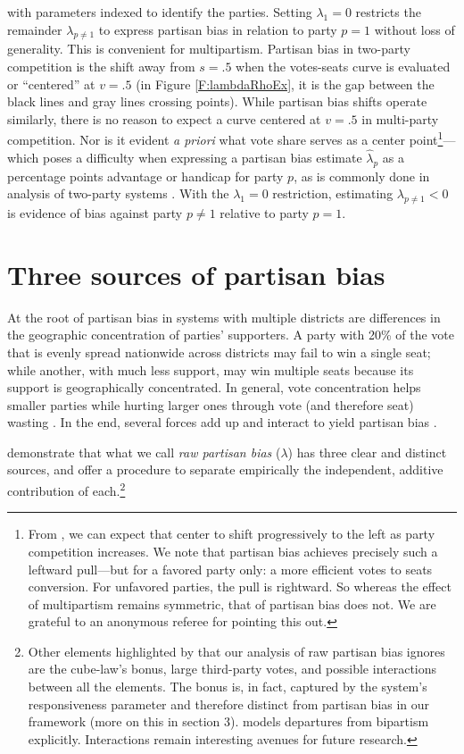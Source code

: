 \documentclass[letter,12pt]{article}
\begin{document}
\noindent with parameters indexed to identify the parties. Setting $\lambda_1 = 0$ restricts the remainder $\lambda_{p \neq 1}$ to express partisan bias in relation to party $p=1$ without loss of generality. This is convenient for multipartism. Partisan bias in two-party competition is the shift away from $s=.5$ when the votes-seats curve is evaluated or ``centered'' at $v=.5$ (in Figure \ref{F:lambdaRhoEx}, it is the gap between the black lines and gray lines crossing points). While partisan bias shifts operate similarly, there is no reason to expect a curve centered at $v=.5$ in multi-party competition. Nor is it evident \emph{a priori} what vote share serves as a center point\footnote{From \citet[][:Fig.~1]{calvo.micozzi.govReform.2005}, we can expect that center to shift progressively to the left as party competition increases. We note that partisan bias achieves precisely such a leftward pull---but for a favored party only: a more efficient votes to seats conversion. For unfavored parties, the pull is rightward. So whereas the effect of multipartism remains symmetric, that of partisan bias does not. We are grateful to an anonymous referee for pointing this out.}---which poses a difficulty when expressing a partisan bias estimate $\hat{\lambda}_p$ as a percentage points advantage or handicap for party $p$, as is commonly done in analysis of two-party systems \citep[e.g.,][]{cox.katz.2002}. With the $\lambda_1 = 0$ restriction, estimating $\lambda_{p \neq 1}<0$ is evidence of bias against party $p \neq 1$ relative to party $p=1$.

\section{Three sources of partisan bias}

At the root of partisan bias in systems with multiple districts are differences in the geographic concentration of parties' supporters. A party with 20\% of the vote  that is evenly spread nationwide across districts may fail to win a single seat; while another, with much less support, may win multiple seats because its support is geographically concentrated. In general, vote concentration helps smaller parties while hurting larger ones through vote (and therefore seat) wasting \citep{calvo.roddenMultipartyPlurality2015}. In the end, several forces add up and interact to yield partisan bias \citep{gudgin.taylor.1980decomposeBias}. 

\citet[][, henceforth GKB]{grofman.etalBiasMalapp.1997} demonstrate that what we call \emph{raw partisan bias} ($\lambda$) has three clear and distinct sources, and offer a procedure to separate empirically the independent, additive contribution of each.\footnote{Other elements highlighted by \citet{gudgin.taylor.1980decomposeBias} that our analysis of raw partisan bias ignores are the cube-law's bonus, large third-party votes, and possible interactions between all the elements. The bonus is, in fact, captured by the system's responsiveness parameter and therefore distinct from partisan bias in our framework (more on this in section 3). \citet{calvo.2009roadToPR} models departures from bipartism explicitly. Interactions remain interesting avenues for future research.} 
\end{document}
